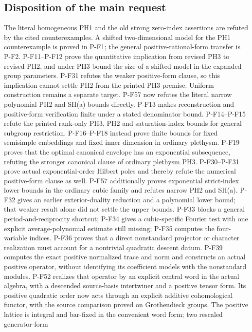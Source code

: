 \subsection{Disposition of the main request}
The literal homogeneous PH1 and the old strong zero-index assertions
are refuted by the cited counterexamples. A shifted two-dimensional
model for the PH1 counterexample is proved in P-F1; the general
positive-rational-form transfer is P-F2. P-F11--P-F12 prove the
quantitative implication from revised PH3 to revised PH2, and under
PH3 bound the size of a shifted model in the expanded group parameters.
P-F31 refutes the weaker positive-form clause, so this implication
cannot settle PH2 from the printed PH3 premise. Uniform construction
remains a separate target. P-F57 now refutes the literal narrow
polynomial PH2 and SH(a) bounds directly. P-F13 makes reconstruction and positive-form verification
finite under a stated denominator bound. P-F14--P-F15 refute the
printed rank-only PH3, PH2 and saturation-index bounds for general
subgroup restriction. P-F16--P-F18 instead prove finite bounds for
fixed semisimple embeddings and fixed inner dimension in ordinary
plethysm. P-F19 proves that the optimal canonical envelope has an
exponential subsequence, refuting the stronger canonical clause of
ordinary plethysm PH3. P-F30--P-F31 prove actual exponential-order
Hilbert poles and thereby refute the numerical positive-form clause
as well. P-F57 additionally proves exponential strict-index lower
bounds in the ordinary cubic family and refutes narrow PH2 and
SH(a). P-F32 gives an earlier exterior-duality reduction and a
polynomial lower bound; that weaker result alone did not settle
the upper bounds.
P-F33 blocks a general period-and-reciprocity shortcut; P-F34 gives
a cubic-specific Fourier test with one explicit average-polynomial
estimate still missing; P-F35 computes the four-variable indices.
P-F36 proves that a direct nonstandard projector or character
realization must account for a nontrivial quadratic descent datum.
P-F39 computes the exact positive normalized trace and norm and
constructs an actual positive operator, without identifying its
coefficient models with the nonstandard modules. P-F52 realizes
that operator by an explicit central word in the actual algebra,
with a descended source-basis intertwiner and a positive tensor
form. Its positive quadratic order now acts through an explicit
additive cohomological functor, with the source comparison proved
on Grothendieck groups. The positive lattice is integral and
bar-fixed in the convenient word form; two rescaled generator-form
